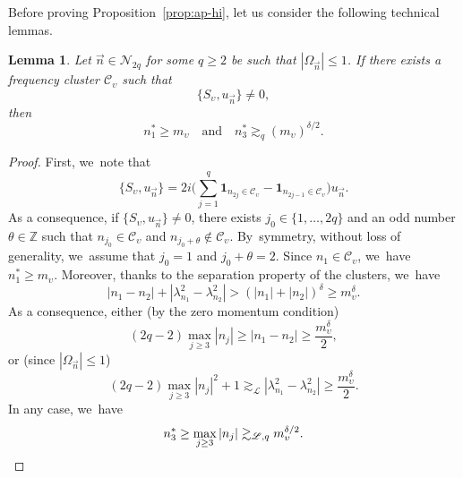 \documentclass[10pt]{amsart}
\theoremstyle{plain}
\newtheorem{lemma}[theorem]{Lemma}
\theoremstyle{definition}
\newcommand{\1}{\mathbf{1}}
\begin{document}
Before proving Proposition~\ref{prop:ap-hi}, let us consider the following technical lemmas.

\begin{lemma}\label{lem:mu3} Let $\vec{n}\in\mathcal{N}_{2q}$ for some $q\geq2$ be such that $|\Omega_{\vec{n}}|\leq 1$. If there exists a frequency cluster $\mathscr{C}_{\upsilon}$ such that
\[
\{ S_{\upsilon}, u_{\vec{n}}\} \neq 0,
\]
then
\[
n_{1}^{\ast}\geq m_\upsilon \quad \mathrm{and} \quad n_{3}^{\ast}\gtrsim_q (m_\upsilon)^{\delta/2}.
\]
\end{lemma}

\begin{proof}
First, we~note that
\[
\{ S_{\upsilon}, u_{\vec{n}}\} = 2i \biggl(\sum_{j=1}^q \mathbf{1}_{n_{2j} \in \mathscr{C}_\upsilon } - \mathbf{1}_{n_{2j-1} \in \mathscr{C}_\upsilon } \biggr) u_{\vec{n}}.
\]
As a consequence, if $\{ S_{\upsilon}, u_{\vec{n}}\} \neq 0$, there exists $j_0 \in \{1,\dots,2q\}$ and an odd number $\theta\in \mathbb{Z}$ such that $n_{j_0} \in \mathscr{C}_\upsilon$ and $n_{j_0 + \theta} \notin \mathscr{C}_\upsilon$. By~symmetry, without loss of generality, we~assume that $j_0=1$ and $j_0 + \theta= 2$. Since $n_1 \in \mathscr{C}_\upsilon$, we~have $n_{1}^{\ast}\geq m_\upsilon$. Moreover, thanks to the separation property of the clusters, we~have
\[
|n_1-n_2| + |\lambda_{n_{1}}^{2}-\lambda_{n_{2}}^{2}| > (|n_1|+|n_2|)^{\delta} \geq m_\upsilon^{\delta}.
\]
As a consequence, either (by the zero momentum condition)
\[
(2q-2) \max_{j\geq 3} |n_j| \geq |n_1-n_2| \geq \frac{m_\upsilon^{\delta}}2,
\]
or (since $|\Omega_{\vec{n}}|\leq 1$)
\[
(2q-2) \max_{j\geq 3} |n_j|^2 + 1 \gtrsim_{\mathscr{L}} |\lambda_{n_{1}}^{2}-\lambda_{n_{2}}^{2}| \geq \frac{m_\upsilon^{\delta}}2.
\]
In any case, we~have
\[
n_3^* \geq \max_{j\geq 3} | n_j | \gtrsim_{\mathscr{L},q} m_\upsilon^{\delta/2}.\qedhere
\]
\end{proof}
\end{document}
